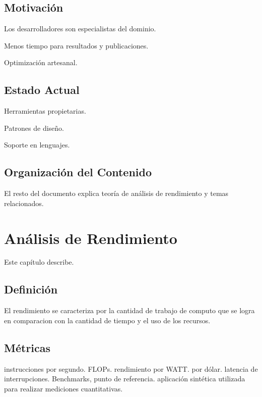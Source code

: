 \documentclass[a4paper]{report}
\begin{document}
\section{Motivaci\'on}

Los desarrolladores son especialistas del dominio.

\bigskip

Menos tiempo para resultados y publicaciones.

\bigskip

Optimizaci\'on artesanal.

\section{Estado Actual}

Herramientas propietarias.

\bigskip

Patrones de dise\~no.

\bigskip

Soporte en lenguajes.

\section{Organizaci\'on del Contenido}

El resto del documento explica teor\'ia de an\'alisis de rendimiento y temas
relacionados.

\chapter{An\'alisis de Rendimiento}

Este cap\'itulo describe.

\section{Definici\'on}

El rendimiento se caracteriza por la cantidad de trabajo de computo que se logra
en comparacion con la cantidad de tiempo y el uso de los recursos.

\section{M\'etricas}

instrucciones por segundo. FLOPs. rendimiento por WATT. por d\'olar.
latencia de interrupciones. Benchmarks, punto de referencia. aplicaci\'on
sint\'etica utilizada para realizar mediciones cuantitativas.
\end{document}
